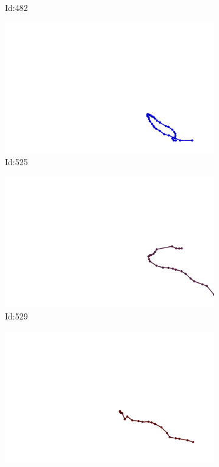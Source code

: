\documentclass[12pt,twoside]{report}
\begin{document}
\begin{figure}
\begin{subfigure}[b]{0.20\textwidth}
\caption{Id:482}
\end{subfigure}
\begin{subfigure}[b]{0.20\textwidth}
\centering
\includegraphics[width=\textwidth]{../trajectories/525.png}
\caption{Id:525}
\end{subfigure}
\begin{subfigure}[b]{0.20\textwidth}
\centering
\includegraphics[width=\textwidth]{../trajectories/529.png}
\caption{Id:529}
\end{subfigure}
\begin{subfigure}[b]{0.20\textwidth}
\centering
\includegraphics[width=\textwidth]{../trajectories/568.png}

\end{subfigure}
\end{figure}
\end{document}
